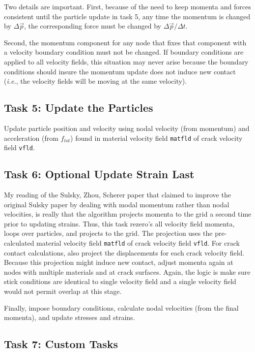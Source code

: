 \documentclass[11pt]{article}
\begin{document}
Two details are important. First, because of the need to keep momenta and forces consistent until the particle update in task 5, any time the momentum is changed by $\Delta\vec p$, the corresponding force must be changed by $\Delta\vec p/\Delta t$.

Second, the momentum component for any node that fixes that component with a velocity boundary condition must not be changed. If boundary conditions are applied to all velocity fields, this situation may never arise because the boundary conditions should insure the momentum update does not induce new contact ({\em i.e.}, the velocity fields will be moving at the same velocity).


\subsection{Task 5: Update the Particles}

Update particle position and velocity using nodal velocity (from momentum) and acceleration (from $f_{tot}$) found in material velocity field {\tt matfld} of crack velocity field {\tt vfld}.

\subsection{Task 6: Optional Update Strain Last}

My reading of the Sulsky, Zhou, Scherer paper that claimed to improve the original Sulsky paper by dealing with modal momentum rather than nodal velocities, is really that the algorithm projects momenta to the grid a second time prior to updating strains. Thus, this task rezero's all velocity field momenta, loops over particles, and projects to the grid. The projection uses the pre-calculated material velocity field {\tt matfld} of crack velocity field {\tt vfld}. For crack contact calculations, also project the displacements for each crack velocity field. Because this projection might induce new contact, adjust momenta again at nodes with multiple materials and at crack surfaces. Again, the logic is make sure stick conditions are identical to single velocity field and a single velocity field would not permit overlap at this stage.

Finally, impose boundary conditions, calculate nodal velocities (from the final momenta), and update stresses and strains.

\subsection{Task 7: Custom Tasks}
\end{document}
